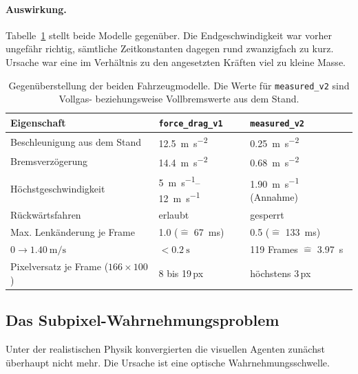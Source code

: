 \paragraph{Auswirkung.}
Tabelle~\ref{tab:physikvergleich} stellt beide Modelle gegenüber. Die Endgeschwindigkeit war vorher ungefähr richtig, sämtliche Zeitkonstanten dagegen rund zwanzigfach zu kurz. Ursache war eine im Verhältnis zu den angesetzten Kräften viel zu kleine Masse.

\begin{table}[htbp]
  \centering
  \caption{Gegenüberstellung der beiden Fahrzeugmodelle. Die Werte für \texttt{measured\_v2} sind Vollgas- beziehungsweise Vollbremswerte aus dem Stand.}
  \label{tab:physikvergleich}
  \small
  \begin{tabularx}{\linewidth}{@{}X l l@{}}
    \toprule
    \textbf{Eigenschaft} & \texttt{force\_drag\_v1} & \texttt{measured\_v2} \\
    \midrule
    Beschleunigung aus dem Stand & \SI{12.5}{\meter\per\second\squared} & \SI{0.25}{\meter\per\second\squared} \\
    Bremsverzögerung             & \SI{14.4}{\meter\per\second\squared} & \SI{0.68}{\meter\per\second\squared} \\
    Höchstgeschwindigkeit        & \SIrange{5}{12}{\meter\per\second} & \SI{1.90}{\meter\per\second} (Annahme) \\
    Rückwärtsfahren              & erlaubt                              & gesperrt \\
    Max. Lenkänderung je Frame   & \num{1.0} ($\hat{=}$ \SI{67}{\milli\second}) & \num{0.5} ($\hat{=}$ \SI{133}{\milli\second}) \\
    $0 \to \SI{1.40}{\meter\per\second}$ & $<\SI{0.2}{\second}$ & \num{119} Frames $\hat{=}$ \SI{3.97}{\second} \\
    Pixelversatz je Frame ($166\times100$) & \num{8} bis \num{19}\,px & höchstens \num{3}\,px \\
    \bottomrule
  \end{tabularx}
\end{table}

\subsection{Das Subpixel-Wahrnehmungsproblem}
\label{subsec:subpixel}

Unter der realistischen Physik konvergierten die visuellen Agenten zunächst überhaupt nicht mehr. Die Ursache ist eine optische Wahrnehmungsschwelle.

